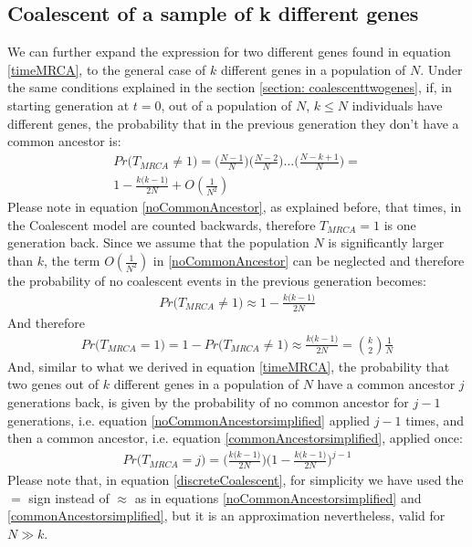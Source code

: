 \documentclass[12pt,mythesisstyle]{report}
\begin{document}
\subsection{Coalescent of a sample of k different genes}\label{section: coalescentngenes}
We can further expand the expression for two different genes found in equation \eqref{timeMRCA}, to the general case of $k$ different genes in a population of $N$. Under the same conditions explained in the section \ref{section: coalescenttwogenes}, if, in starting generation at $t=0$, out of a population of $N$, $k \leq N$ individuals have different genes, the probability that in the previous generation they don't have a common ancestor is:
\begin{equation}\label{noCommonAncestor}
\begin{split}
Pr\big(T_{MRCA}\neq 1\big)=\big(\frac{N-1}{N}\big)\big(\frac{N-2}{N}\big)...\big(\frac{N-k+1}{N}\big)= \\ 1-\frac{k\big(k-1)}{2N}+O(\frac{1}{N^2})
\end{split}
\end{equation}
Please note in equation \eqref{noCommonAncestor}, as explained before, that times, in the Coalescent model are counted backwards, therefore $T_{MRCA}=1$ is one generation back. Since we assume that the population $N$ is significantly larger than $k$, the term $O(\frac{1}{N^2})$ in \eqref{noCommonAncestor} can be neglected and therefore the probability of no coalescent events in the previous generation becomes:
\begin{equation}\label{noCommonAncestorsimplified}
\begin{split}
Pr\big(T_{MRCA}\neq 1\big)\approx 1-\frac{k\big(k-1)}{2N}
\end{split}
\end{equation}
And therefore
\begin{equation}\label{commonAncestorsimplified}
\begin{split}
Pr\big(T_{MRCA}= 1\big)= 1- Pr\big(T_{MRCA}\neq 1\big)\approx \frac{k\big(k-1)}{2N}=\binom{k}{2}\frac{1}{N}
\end{split}
\end{equation}
And, similar to what we derived in equation \eqref{timeMRCA}, the probability that two genes out of $k$ different genes in a population of $N$ have a common ancestor $j$ generations back, is given by the probability of no common ancestor for $j-1$ generations, i.e. equation \eqref{noCommonAncestorsimplified} applied $j-1$ times, and then a common ancestor, i.e. equation \eqref{commonAncestorsimplified}, applied once:
\begin{equation}\label{discreteCoalescent}
\begin{split}
Pr\big(T_{MRCA}=j \big)=\bigg(\frac{k\big(k-1)}{2N}\bigg) \bigg(1-\frac{k\big(k-1)}{2N}\bigg)^{j-1}
\end{split}
\end{equation}
Please note that, in equation \eqref{discreteCoalescent}, for simplicity we have used the $=$ sign instead of $\approx$ as in equations \eqref{noCommonAncestorsimplified} and \eqref{commonAncestorsimplified}, but it is an approximation nevertheless, valid for $N\gg k$.
\end{document}
